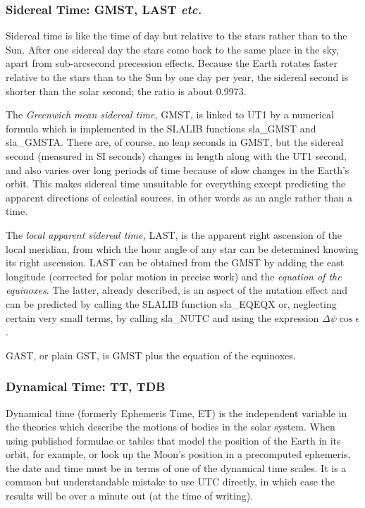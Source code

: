 \documentclass[11pt,twoside]{article}
\begin{document}
\subsubsection{Sidereal Time: GMST, LAST {\it etc.}}
Sidereal time is like the time of day but relative to the
stars rather than to the Sun.  After
one sidereal day the stars come back to the same place in the
sky, apart from sub-arcsecond precession effects.  Because the Earth
rotates faster relative to the stars than to the Sun by one day
per year, the sidereal second is shorter than the solar
second; the ratio is about 0.9973.

The {\it Greenwich mean sidereal time,} GMST, is
linked to UT1 by a numerical formula which
is implemented in the SLALIB functions
sla\_GMST
and
sla\_GMSTA.
There are, of course, no leap seconds in GMST, but the sidereal
second (measured in SI seconds)
changes in length along with the UT1 second, and also varies
over long periods of time because of slow changes in the Earth's
orbit.  This makes sidereal time unsuitable for everything except
predicting the apparent directions of celestial sources, in other
words as an angle rather than a time.

The {\it local apparent sidereal time,} LAST, is the apparent right
ascension of the local meridian, from which the hour angle of any
star can be determined knowing its right
ascension.  LAST can be obtained from the
GMST by adding the east longitude (corrected for polar motion
in precise work) and the {\it equation of the equinoxes}.  The
latter, already described, is an aspect of the nutation effect
and can be predicted by calling the SLALIB function
sla\_EQEQX
or, neglecting certain very small terms, by calling
sla\_NUTC
and using the expression $\Delta\psi\cos\epsilon$.

GAST, or plain GST, is GMST plus the equation of the equinoxes.

\subsubsection{Dynamical Time: TT, TDB}
Dynamical time (formerly Ephemeris Time, ET)
is the independent variable in the theories
which describe the motions of bodies in the solar system.  When
using published formulae or
tables that model the position of the
Earth in its orbit, for example, or look up
the Moon's position in a precomputed ephemeris, the date and time
must be in terms of one of the dynamical time scales.  It
is a common but understandable mistake to use UTC directly, in which
case the results will be over a minute out (at the time of writing).
\end{document}
